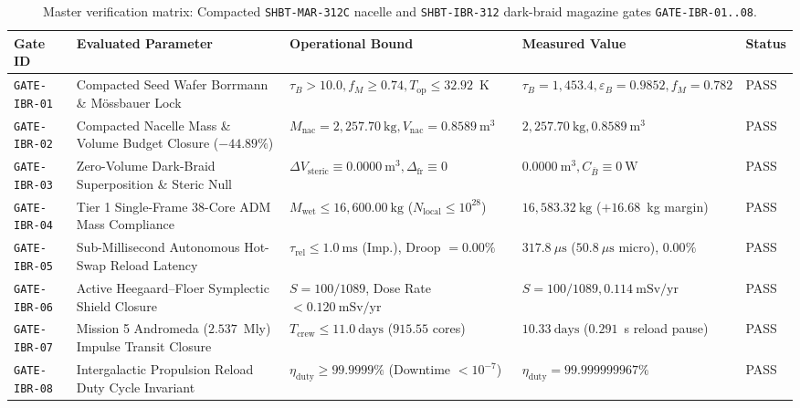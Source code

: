\documentclass[11pt,onecolumn]{article}
\begin{document}
\begin{table}[!htbp]
\centering\small
\caption{Master verification matrix: Compacted \texttt{SHBT-MAR-312C} nacelle and \texttt{SHBT-IBR-312} dark-braid magazine gates \texttt{GATE-IBR-01..08}.}
\label{tab:matrix_ibr}
\begin{tabularx}{\textwidth}{@{}l p{4.5cm} p{3.1cm} X l@{}}
\toprule
Gate ID & Evaluated Parameter & Operational Bound & Measured Value & Status \\
\midrule
\texttt{GATE-IBR-01} & Compacted Seed Wafer Borrmann \& M\"{o}ssbauer Lock & $\tau_B > 10.0, f_M \ge 0.74, T_{\mathrm{op}} \le 32.92$~K & $\tau_B = 1{,}453.4, \varepsilon_B = 0.9852, f_M = 0.782$ & PASS \\
\texttt{GATE-IBR-02} & Compacted Nacelle Mass \& Volume Budget Closure ($-44.89\%$) & $M_{\mathrm{nac}} = 2{,}257.70~\mathrm{kg}, V_{\mathrm{nac}} = 0.8589~\mathrm{m}^3$ & $2{,}257.70~\mathrm{kg}, 0.8589~\mathrm{m}^3$ & PASS \\
\texttt{GATE-IBR-03} & Zero-Volume Dark-Braid Superposition \& Steric Null & $\Delta V_{\mathrm{steric}} \equiv 0.0000~\mathrm{m}^3, \Delta_{\mathrm{fr}} \equiv 0$ & $0.0000~\mathrm{m}^3, C_{\bar{B}} \equiv 0~\mathrm{W}$ & PASS \\
\texttt{GATE-IBR-04} & Tier 1 Single-Frame 38-Core ADM Mass Compliance & $M_{\mathrm{wet}} \le 16{,}600.00~\mathrm{kg}$ ($N_{\mathrm{local}} \le 10^{28}$) & $16{,}583.32~\mathrm{kg}$ ($+16.68$~kg margin) & PASS \\
\texttt{GATE-IBR-05} & Sub-Millisecond Autonomous Hot-Swap Reload Latency & $\tau_{\mathrm{rel}} \le 1.0~\mathrm{ms}$ (Imp.), Droop $= 0.00\%$ & $317.8~\mu\mathrm{s}$ ($50.8~\mu\mathrm{s}$ micro), $0.00\%$ & PASS \\
\texttt{GATE-IBR-06} & Active Heegaard--Floer Symplectic Shield Closure & $S = 100/1089$, Dose Rate $< 0.120~\mathrm{mSv/yr}$ & $S = 100/1089, 0.114~\mathrm{mSv/yr}$ & PASS \\
\texttt{GATE-IBR-07} & Mission 5 Andromeda ($2.537$~Mly) Impulse Transit Closure & $T_{\mathrm{crew}} \le 11.0~\mathrm{days}$ ($915.55$ cores) & $10.33~\mathrm{days}$ ($0.291$~s reload pause) & PASS \\
\texttt{GATE-IBR-08} & Intergalactic Propulsion Reload Duty Cycle Invariant & $\eta_{\mathrm{duty}} \ge 99.9999\%$ (Downtime $< 10^{-7}$) & $\eta_{\mathrm{duty}} = 99.999999967\%$ & PASS \\
\bottomrule
\end{tabularx}
\end{table}
\end{document}
